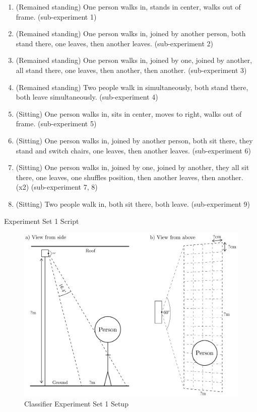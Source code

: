 \documentclass[../thesis/thesis.tex]{subfiles}
\begin{document}
\begin{table}
\centering
\begin{enumerate}
\item (Remained standing) One person walks in, stands in center, walks out of frame. (sub-experiment 1)
\item (Remained standing) One person walks in, joined by another person, both stand there, one leaves, then another leaves. (sub-experiment 2)
\item (Remained standing) One person walks in, joined by one, joined by another, all stand there, one leaves, then another, then another. (sub-experiment 3)
\item (Remained standing) Two people walk in simultaneously, both stand there, both leave simultaneously. (sub-experiment 4)
\item (Sitting) One person walks in, sits in center, moves to right, walks out of frame. (sub-experiment 5)
\item (Sitting) One person walks in, joined by another person, both sit there, they stand and switch chairs, one leaves, then another leaves. (sub-experiment 6)
\item (Sitting) One person walks in, joined by one, joined by another, they all sit there, one leaves, one shuffles position, then another leaves, then another. (x2) (sub-experiment 7, 8)
\item (Sitting) Two people walk in, both sit there, both leave. (sub-experiment 9)
\end{enumerate}
\caption{Experiment Set 1 Script}
\label{tab:exps:3script}
\end{table}

\begin{landscape}
 \begin{figure}
 \centering
 \includegraphics[height=\textheight]{../diagrams/third-exp-setup2.pdf}
 \caption{Classifier Experiment Set 1 Setup}
 \label{fig:exps:3setup}
 \end{figure}
\end{landscape}
\end{document}

